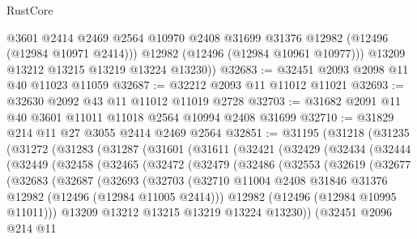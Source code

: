 \begin{lexlean}{RustCore}
\begin{coremodule}
            @3601
            @2414
            @2469
            @2564
            @10970
            @2408
            @31699
            @31376
            @12982
            (@12496 (@12984 @10971 @2414)))
          @12982
          (@12496 (@12984 @10961 @10977)))
        @13209
        @13212
        @13215
        @13219
        @13224
        @13230))
@32683 := @32451 @2093 @2098 @11 @40 @11023 @11059
@32687 := @32212 @2093 @11 @11012 @11021
@32693 := @32630 @2092 @43 @11 @11012 @11019 @2728
@32703 := @31682 @2091 @11 @40 @3601 @11011 @11018 @2564 @10994 @2408 @31699
@32710 := @31829 @214 @11 @27 @3055 @2414 @2469 @2564
@32851 := @31195
    (@31218
      (@31235
        (@31272
          (@31283
            (@31287
              (@31601
                (@31611
                  (@32421
                    (@32429
                      (@32434
                        (@32444
                          (@32449
                            (@32458
                              (@32465
                                (@32472
                                  (@32479
                                    (@32486
                                      (@32553
                                        (@32619
                                          (@32677
                                            (@32683
                                              (@32687
                                                (@32693
                                                  (@32703
                                                    (@32710
                                                      @11004
                                                      @2408
                                                      @31846
                                                      @31376
                                                      @12982
                                                      (@12496 (@12984 @11005 @2414)))
                                                    @12982
                                                    (@12496 (@12984 @10995 @11011)))
                                                  @13209
                                                  @13212
                                                  @13215
                                                  @13219
                                                  @13224
                                                  @13230))
                                              (@32451
                                                @2096
                                                @214
                                                @11

\end{coremodule}
\end{lexlean}
